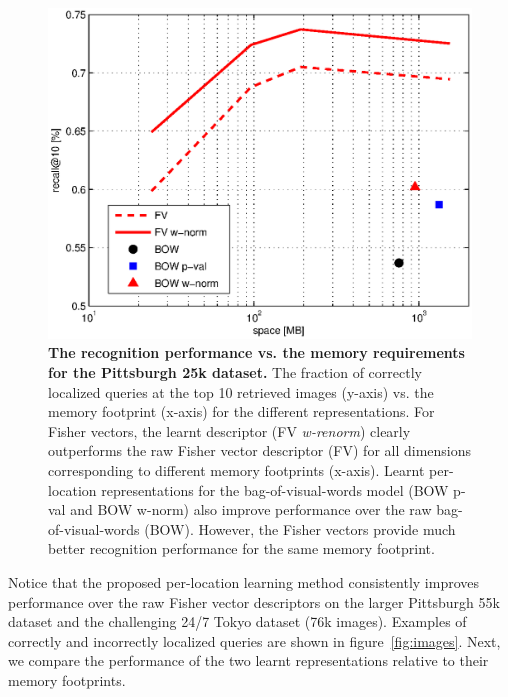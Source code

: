     \begin{figure}[]
        \centering
        \includegraphics[width=1.1\linewidth]{imgs/FVmemory03.eps}
        \setcounter{figure}{6}    
        \caption{
            \textbf{The recognition performance vs. the memory requirements for the Pittsburgh 25k dataset.} 
            The fraction of correctly localized queries at the top 10 retrieved images (y-axis) vs. the memory footprint (x-axis) for the different representations. For Fisher vectors, the learnt descriptor (FV \emph{w-renorm}) clearly outperforms the raw Fisher vector descriptor (FV) for all dimensions corresponding to different memory footprints (x-axis). 
            Learnt per-location representations for the bag-of-visual-words model (BOW p-val and BOW w-norm) also improve performance over the raw bag-of-visual-words (BOW). However, the Fisher vectors provide much better recognition performance for the same memory footprint.  
        }
        \label{fig:memory}
    \end{figure}
%
  {
    Notice that the proposed per-location learning method consistently improves performance over the raw Fisher vector descriptors on the larger Pittsburgh 55k dataset and the challenging 24/7 Tokyo dataset (76k images).
  } 
  Examples of correctly and incorrectly localized queries are shown in figure~\ref{fig:images}.
  \noindent
  Next, we compare the performance of the two learnt representations relative to their memory footprints.  
%   
